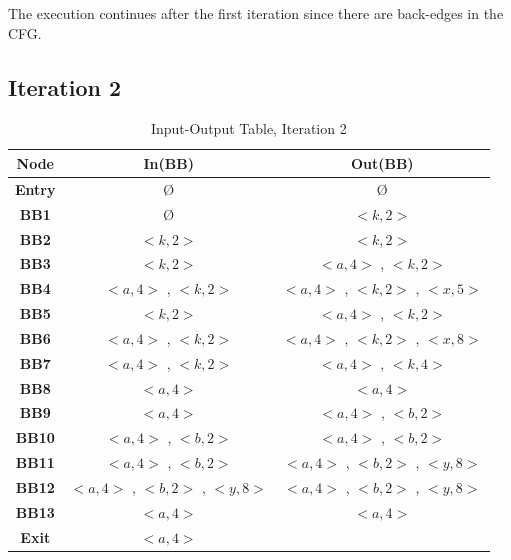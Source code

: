 \documentclass[a4paper,12pt,numbers=noenddot]{scrreprt}
\begin{document}
        The execution continues after the first iteration since there are back-edges in the CFG.
    
    \subsection*{Iteration 2}

        \begin{table}[H]
            \centering
            \begin{tabular}{|c|c|c|}
                \hline
                \textbf{Node} & \textbf{In(BB)} & \textbf{Out(BB)} \\
                \hline
                \textbf{Entry} & Ø & Ø \\
                \textbf{BB1}   & Ø & $<k, 2>$ \\
                \textbf{BB2}   & $<k, 2>$ & $<k, 2>$ \\
                \textbf{BB3}   & $<k, 2>$ & $<a, 4>$ , $<k, 2>$  \\
                \textbf{BB4}   & $<a, 4>$ , $<k, 2>$ & $<a, 4>$ , $<k, 2>$ , $<x, 5>$ \\
                \textbf{BB5}   & $<k, 2>$ &  $<a, 4>$ , $<k, 2>$ \\
                \textbf{BB6}   & $<a, 4>$ , $<k, 2>$ & $<a, 4>$ , $<k, 2>$ , $<x, 8>$ \\
                \textbf{BB7}   & $<a, 4>$ , $<k, 2>$ & $<a, 4>$ , $<k, 4>$ \\
                \textbf{BB8}   & $<a, 4>$ & $<a, 4>$ \\
                \textbf{BB9}   & $<a, 4>$ & $<a, 4>$ , $<b, 2>$ \\
                \textbf{BB10}  & $<a, 4>$ , $<b, 2>$ & $<a, 4>$ , $<b, 2>$ \\
                \textbf{BB11}  & $<a, 4>$ , $<b, 2>$ & $<a, 4>$ , $<b, 2>$ , $<y, 8>$ \\
                \textbf{BB12}  & $<a, 4>$ , $<b, 2>$ , $<y, 8>$ & $<a, 4>$ , $<b, 2>$ , $<y, 8>$ \\
                \textbf{BB13}  & $<a, 4>$ & $<a, 4>$ \\
                \textbf{Exit}  & $<a, 4>$ & \\
                \hline
            \end{tabular}
            \caption{Input-Output Table, Iteration 2}
            \label{tab:cp_input_output_table2}
        \end{table}
\end{document}
